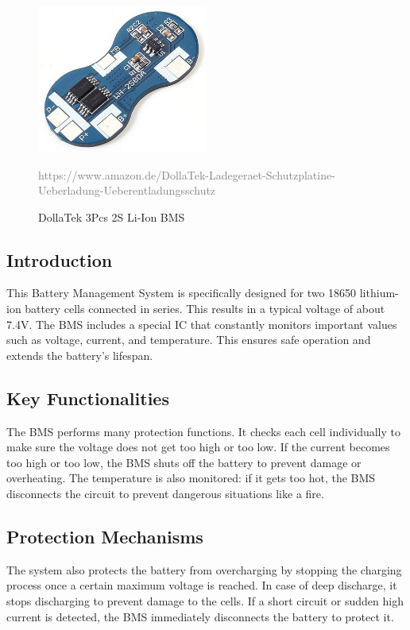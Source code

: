 \begin{figure}[h]
\centering
\includegraphics[width=0.5\textwidth]{assets/BMS}
\caption{DollaTek 3Pcs 2S Li-Ion BMS}
\textcolor{gray}{https://www.amazon.de/DollaTek-Ladegeraet-Schutzplatine-Ueberladung-Ueberentladungsschutz}
\label{fig:BMS}
\end{figure}

\subsection*{Introduction}
\noindent This Battery Management System is specifically designed for two 18650 lithium-ion battery cells connected in series. This results in a typical voltage of about 7.4V. The BMS includes a special IC that constantly monitors important values such as voltage, current, and temperature. This ensures safe operation and extends the battery's lifespan.

\subsection*{Key Functionalities}
The BMS performs many protection functions. It checks each cell individually to make sure the voltage does not get too high or too low. If the current becomes too high or too low, the BMS shuts off the battery to prevent damage or overheating. The temperature is also monitored: if it gets too hot, the BMS disconnects the circuit to prevent dangerous situations like a fire.

\subsection*{Protection Mechanisms}
The system also protects the battery from overcharging by stopping the charging process once a certain maximum voltage is reached. In case of deep discharge, it stops discharging to prevent damage to the cells. If a short circuit or sudden high current is detected, the BMS immediately disconnects the battery to protect it.

